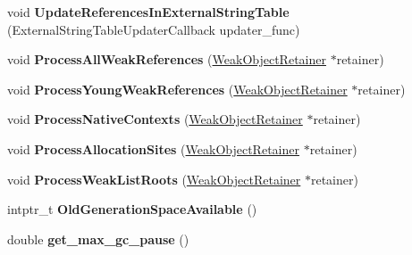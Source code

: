 \begin{DoxyCompactItemize}
\item 
void {\bfseries Update\+References\+In\+External\+String\+Table} (External\+String\+Table\+Updater\+Callback updater\+\_\+func)\hypertarget{classv8_1_1internal_1_1_heap_ad5389324ddf98758e5034523b9861a7e}{}\label{classv8_1_1internal_1_1_heap_ad5389324ddf98758e5034523b9861a7e}

\item 
void {\bfseries Process\+All\+Weak\+References} (\hyperlink{classv8_1_1internal_1_1_weak_object_retainer}{Weak\+Object\+Retainer} $\ast$retainer)\hypertarget{classv8_1_1internal_1_1_heap_a138e7c8eb416809cbda8fc2fbbc28b17}{}\label{classv8_1_1internal_1_1_heap_a138e7c8eb416809cbda8fc2fbbc28b17}

\item 
void {\bfseries Process\+Young\+Weak\+References} (\hyperlink{classv8_1_1internal_1_1_weak_object_retainer}{Weak\+Object\+Retainer} $\ast$retainer)\hypertarget{classv8_1_1internal_1_1_heap_aa10916e930a0cafd67b832a28793bbeb}{}\label{classv8_1_1internal_1_1_heap_aa10916e930a0cafd67b832a28793bbeb}

\item 
void {\bfseries Process\+Native\+Contexts} (\hyperlink{classv8_1_1internal_1_1_weak_object_retainer}{Weak\+Object\+Retainer} $\ast$retainer)\hypertarget{classv8_1_1internal_1_1_heap_a59c388a2ec38ecc4584e5421f288cb73}{}\label{classv8_1_1internal_1_1_heap_a59c388a2ec38ecc4584e5421f288cb73}

\item 
void {\bfseries Process\+Allocation\+Sites} (\hyperlink{classv8_1_1internal_1_1_weak_object_retainer}{Weak\+Object\+Retainer} $\ast$retainer)\hypertarget{classv8_1_1internal_1_1_heap_aa37bb60fc9a958647ad1e55d0464275a}{}\label{classv8_1_1internal_1_1_heap_aa37bb60fc9a958647ad1e55d0464275a}

\item 
void {\bfseries Process\+Weak\+List\+Roots} (\hyperlink{classv8_1_1internal_1_1_weak_object_retainer}{Weak\+Object\+Retainer} $\ast$retainer)\hypertarget{classv8_1_1internal_1_1_heap_a132ff2665961ba28fb59a6e2e0edf9bc}{}\label{classv8_1_1internal_1_1_heap_a132ff2665961ba28fb59a6e2e0edf9bc}

\item 
intptr\+\_\+t {\bfseries Old\+Generation\+Space\+Available} ()\hypertarget{classv8_1_1internal_1_1_heap_a6a8ee5e12c66403def218da520794671}{}\label{classv8_1_1internal_1_1_heap_a6a8ee5e12c66403def218da520794671}

\item 
double {\bfseries get\+\_\+max\+\_\+gc\+\_\+pause} ()\hypertarget{classv8_1_1internal_1_1_heap_a5c44d1b4c867ad7db5ef32e99b5ec0cd}{}\label{classv8_1_1internal_1_1_heap_a5c44d1b4c867ad7db5ef32e99b5ec0cd}


\end{DoxyCompactItemize}
